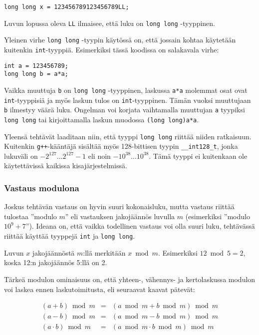 \begin{lstlisting}
long long x = 123456789123456789LL;
\end{lstlisting}
Luvun lopussa oleva \texttt{LL}
ilmaisee, että luku on \texttt{long long} -tyyppinen.

Yleinen virhe \texttt{long long} -tyypin käytössä on,
että jossain kohtaa käytetään kuitenkin \texttt{int}-tyyppiä.
Esimerkiksi tässä koodissa on salakavala virhe:

\begin{lstlisting}
int a = 123456789;
long long b = a*a;
\end{lstlisting}

Vaikka muuttuja \texttt{b} on \texttt{long long} -tyyppinen,
laskussa \texttt{a*a} molemmat osat ovat \texttt{int}-tyyppisiä
ja myös laskun tulos on \texttt{int}-tyyppinen.
Tämän vuoksi muuttujaan \texttt{b} ilmestyy väärä luku.
Ongelman voi korjata vaihtamalla muuttujan \texttt{a}
tyypiksi \texttt{long long} tai kirjoittamalla
laskun muodossa \texttt{(long long)a*a}.

Yleensä tehtävät laaditaan niin, että tyyppi
\texttt{long long} riittää niiden ratkaisuun.
Kuitenkin \texttt{g++}-kääntäjä sisältää myös 128-bittisen
tyypin \texttt{\_\_int128\_t}, jonka lukuväli on
$-2^{127} \ldots 2^{127}-1$ eli noin $-10^{38} \ldots 10^{38}$.
Tämä tyyppi ei kuitenkaan ole käytettävissä kaikissa kisajärjestelmissä.

\subsubsection{Vastaus modulona}


Joskus tehtävän vastaus on hyvin suuri kokonaisluku,
mutta vastaus riittää tulostaa ''modulo $m$''
eli vastauksen jakojäännös luvulla $m$
(esimerkiksi ''modulo $10^9+7$'').
Ideana on, että vaikka todellinen vastaus
voi olla suuri luku,
tehtävässä riittää käyttää tyyppejä \texttt{int} ja \texttt{long long}.

Luvun $x$ jakojäännöstä $m$:llä
merkitään $x \bmod m$.
Esimerkiksi $12 \bmod 5 = 2$,
koska 12:n jakojäännös 5:llä on 2.

Tärkeä modulon ominaisuus on,
että yhteen-, vähennys- ja kertolaskussa
modulon voi laskea ennen laskutoimitusta,
eli seuraavat kaavat pätevät:

\[
\begin{array}{rcr}
(a+b) \bmod m & = & (a \bmod m + b \bmod m) \bmod m \\
(a-b) \bmod m & = & (a \bmod m - b \bmod m) \bmod m \\
(a \cdot b) \bmod m & = & (a \bmod m \cdot b \bmod m) \bmod m
\end{array}
\]

